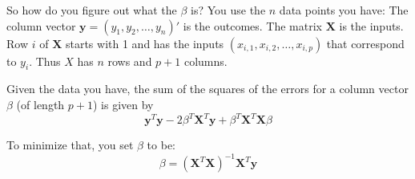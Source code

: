 \documentclass[12pt]{article}
\begin{document}
So how do you figure out what the $\beta$ is? You use the $n$ data points you have: The column vector $\boldsymbol{y} = (y_1, y_2, \ldots, y_n)'$ is the outcomes. The matrix $\boldsymbol{X}$ is the inputs.  Row $i$ of $\boldsymbol{X}$ starts with 1 and has the inputs $(x_{i,1}, x_{i,2},\ldots,x_{i, p})$ that correspond to $y_i$. Thus $X$ has $n$ rows and $p+1$ columns.

Given the data you have, the sum of the squares of the errors for a column vector $\beta$ (of length $p + 1$) is given by 
\begin{equation*}
\boldsymbol{y}^T \boldsymbol{y} - 2 \beta^T \boldsymbol{X}^T \boldsymbol{y} + \beta^T \boldsymbol{X}^T \boldsymbol{X} \beta
\end{equation*}

To minimize that, you set $\beta$ to be:
\begin{equation*}
\beta = \left( \boldsymbol{X}^T \boldsymbol{X} \right)^{-1} \boldsymbol{X}^T \boldsymbol{y}
\end{equation*}
\end{document}
